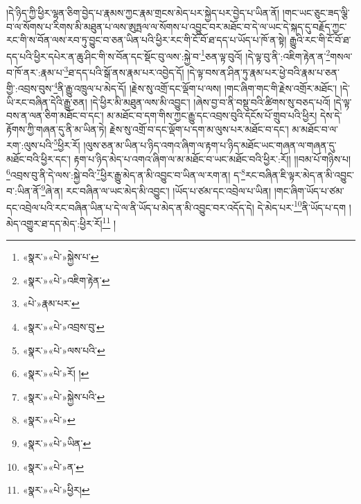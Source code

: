 །དེ་ཉིད་ཀྱི་ཕྱིར་ལྷན་ཅིག་བྱེད་པ་རྣམས་ཀྱང་རྣམ་གྲངས་མེད་པར་སྐྱེད་པར་བྱེད་པ་ཡིན་ནོ། །གང་ཡང་ཅུང་ཟད་ལྕི་བ་ལ་སོགས་པ་རིགས་མི་མཐུན་པ་ལས་ཨུཏྤལ་ལ་སོགས་པ་འབྱུང་བར་མཐོང་བ་དེ་ལ་ཡང་དེ་སྐད་དུ་བརྗོད་ཀྱང་རང་གི་ས་བོན་ལས་རབ་ཏུ་བྱུང་བ་ཅན་ཡིན་པའི་ཕྱིར་རང་གི་ངོ་བོ་ཐ་དད་པ་ཡོད་པ་ཁོ་ན་སྟེ། རྒྱུའི་རང་གི་ངོ་བོ་ཐ་དད་པའི་ཕྱིར་དཔེར་ན་ཆུ་ཤིང་གི་ས་བོན་དང་སྡོང་བུ་ལས་:སྐྱེ་བ་\footnote{«སྣར་»«པེ་»སྐྱེས་པ་}ཅན་ལྟ་བུའོ། །དེ་ལྟ་བུ་ནི་:འཇིག་རྟེན་ན་\footnote{«སྣར་»«པེ་»འཇིག་རྟེན་}གསལ་བ་ཁོ་ནར་:རྣམ་པ་\footnote{«པེ་»རྣམ་པར་}ཐ་དད་པའི་སྒོ་ནས་རྣམ་པར་འབྱེད་དོ། །དེ་ལྟ་བས་ན་ཤིན་ཏུ་རྣམ་པར་ཕྱེ་བའི་རྣམ་པ་ཅན་གྱི་:འབྲས་བུས་\footnote{«སྣར་»«པེ་»འབྲས་བུ་}ནི་རྒྱུ་འཁྲུལ་པ་མེད་དོ། །རྗེས་སུ་འགྲོ་དང་ལྡོག་པ་ལས། །གང་ཞིག་གང་གི་རྗེས་འགྲོར་མཐོང་། །དེ་ཡི་རང་བཞིན་དེའི་རྒྱུ་ཅན། །དེ་ཕྱིར་མི་མཐུན་ལས་མི་འབྱུང་། །ཞེས་བྱ་བ་ནི་བསྡུ་བའི་ཚིགས་སུ་བཅད་པའོ། །དེ་ལྟ་བས་ན་ལན་ཅིག་མཐོང་བ་དང་། མ་མཐོང་བ་དག་གིས་ཀྱང་རྒྱུ་དང་འབྲས་བུའི་དངོས་པོ་གྲུབ་པའི་ཕྱིར། དེས་དེ་རྟོགས་ཀྱི་གཞན་དུ་ནི་མ་ཡིན་ཏེ། རྗེས་སུ་འགྲོ་བ་དང་ལྡོག་པ་དག་མ་ལུས་པར་མཐོང་བ་དང་། མ་མཐོང་བ་ལ་རག་:ལུས་པའི་\footnote{«སྣར་»«པེ་»ལས་པའི་}ཕྱིར་རོ། །ལུས་ཅན་མ་ཡིན་པ་ཉིད་འགའ་ཞིག་ལ་རྟག་པ་ཉིད་མཐོང་ཡང་གཞན་ལ་གཞན་དུ་མཐོང་བའི་ཕྱིར་དང་། རྟག་པ་ཉིད་མེད་པ་འགའ་ཞིག་ལ་མ་མཐོང་བ་ཡང་མཐོང་བའི་ཕྱིར་:རོ།། །།བམ་པོ་གཉིས་པ། \footnote{«སྣར་»«པེ་»རོ། ། }འབྲས་བུ་ནི་དེ་ལས་:སྐྱེ་བའི་\footnote{«སྣར་»«པེ་»སྐྱེས་པའི་}ཕྱིར་རྒྱུ་མེད་ན་མི་འབྱུང་བ་ཡིན་ལ་རག་ན། ད་\footnote{«སྣར་»«པེ་»}རང་བཞིན་ཇི་ལྟར་མེད་ན་མི་འབྱུང་བ་:ཡིན་ནོ་\footnote{«སྣར་»«པེ་»ཡིན་}ཞེ་ན། རང་བཞིན་ལ་ཡང་མེད་མི་འབྱུང་། །ཡོད་པ་ཙམ་དང་འབྲེལ་པ་ཡིན། །གང་ཞིག་ཡོད་པ་ཙམ་དང་འབྲེལ་པའི་རང་བཞིན་ཡིན་པ་དེ་ལ་ནི་ཡོད་པ་མེད་ན་མི་འབྱུང་བར་འདོད་དེ། དེ་མེད་པར་\footnote{«སྣར་»«པེ་»ན་}ནི་ཡོད་པ་དག །མེད་འགྱུར་ཐ་དད་མེད་:ཕྱིར་རོ།\footnote{«སྣར་»«པེ་»ཕྱིར།} །
